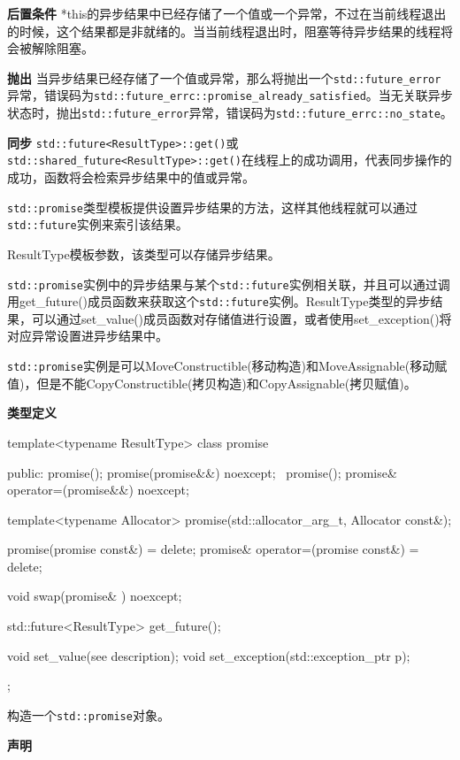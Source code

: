 \textbf{后置条件}
*this的异步结果中已经存储了一个值或一个异常，不过在当前线程退出的时候，这个结果都是非就绪的。当当前线程退出时，阻塞等待异步结果的线程将会被解除阻塞。

\textbf{抛出}
当异步结果已经存储了一个值或异常，那么将抛出一个\texttt{std::future\_error}异常，错误码为\texttt{std::future\_errc::promise\_already\_satisfied}。当无关联异步状态时，抛出\texttt{std::future\_error}异常，错误码为\texttt{std::future\_errc::no\_state}。

\textbf{同步}
\texttt{std::future<ResultType>::get()}或\texttt{std::shared\_future<ResultType>::get()}在线程上的成功调用，代表同步操作的成功，函数将会检索异步结果中的值或异常。


\texttt{std::promise}类型模板提供设置异步结果的方法，这样其他线程就可以通过\texttt{std::future}实例来索引该结果。

ResultType模板参数，该类型可以存储异步结果。

\texttt{std::promise}实例中的异步结果与某个\texttt{std::future}实例相关联，并且可以通过调用get\_future()成员函数来获取这个\texttt{std::future}实例。ResultType类型的异步结果，可以通过set\_value()成员函数对存储值进行设置，或者使用set\_exception()将对应异常设置进异步结果中。

\texttt{std::promise}实例是可以MoveConstructible(移动构造)和MoveAssignable(移动赋值)，但是不能CopyConstructible(拷贝构造)和CopyAssignable(拷贝赋值)。

\textbf{类型定义}

\begin{cpp}
template<typename ResultType>
class promise
{
public:
  promise();
  promise(promise&&) noexcept;
  ~promise();
  promise& operator=(promise&&) noexcept;

  template<typename Allocator>
  promise(std::allocator_arg_t, Allocator const&);

  promise(promise const&) = delete;
  promise& operator=(promise const&) = delete;

  void swap(promise& ) noexcept;

  std::future<ResultType> get_future();

  void set_value(see description);
  void set_exception(std::exception_ptr p);
};
\end{cpp}


构造一个\texttt{std::promise}对象。

\textbf{声明}

